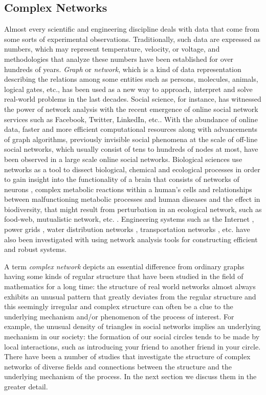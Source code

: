 \documentclass{article}
\begin{document}
	\subsection{Complex Networks}
	Almost every scientific and engineering discipline deals with data that come from some sorts of experimental observations. Traditionally, such data are expressed as numbers, which may represent temperature, velocity, or voltage, and methodologies that analyze these numbers have been established for over hundreds of years. \textit{Graph} or \textit{network}, which is a kind of data representation describing the relations among some entities such as persons, molecules, animals, logical gates, etc., has been used as a new way to approach, interpret and solve real-world problems in the last decades. Social science, for instance, has witnessed the power of network analysis with the recent emergence of online social network services such as Facebook, Twitter, LinkedIn, etc.\cite{Kleinberg:1}. With the abundance of online data, faster and more efficient computational resources along with advancements of graph algorithms, previously invisible social phenomena at the scale of off-line social networks, which usually consist of tens to hundreds of nodes at most, have been observed in a large scale online social networks.  Biological sciences use networks as a tool to dissect biological, chemical and ecological processes in order to gain insight into the functionality of a brain that consists of networks of neurons \cite{BrainNetwork}, complex metabolic reactions within a human's cells and relationships between malfunctioning metabolic processes and human diseases \cite{MetabolicNetworkAndDiseases} and the effect in biodiversity, that might result from perturbation in an ecological network, such as food-web, mutualistic network, etc. \cite{EcologicalNetwork}. Engineering systems such as the Internet \cite{Internet}, power grids \cite{PowerGrid}, water distribution networks \cite{WaterDistribution}, transportation networks \cite{Train}, etc. have also been investigated with using network analysis tools for constructing efficient and robust systems. 
	
	A term \textit{complex network} depicts an essential difference from ordinary graphs having some kinds of regular structure that have been studied in the field of mathematics for a long time: the structure of real world networks almost always exhibits an unusual pattern that greatly deviates from the regular structure and this seemingly irregular and complex structure can often be a clue to the underlying mechanism and/or phenomenon of the process of interest.  For example, the unusual density of triangles in social networks implies an underlying mechanism in our society: the formation of our social circles tends to be made by local interactions, such as introducing your friend to another friend in your circle. There have been a number of studies that investigate the structure of complex networks of diverse fields and connections between the structure and the underlying mechanism of the process. In the next section we discuss them in the greater detail.
	
\end{document}
